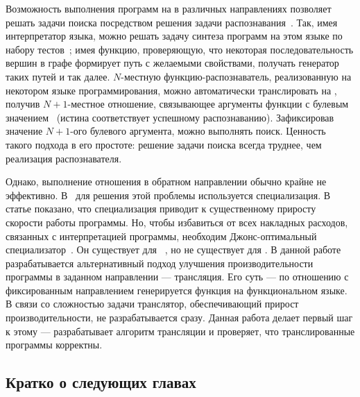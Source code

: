 Возможность выполнения программ на \miniKanren{} в различных направлениях позволяет решать задачи поиска посредством решения задачи распознавания~\cite{lozov2019relational}.
Так, имея интерпретатор языка, можно решать задачу синтеза программ на этом языке по набору тестов~\cite{byrd2017unified}; имея функцию, проверяющую, что некоторая последовательность вершин в графе формирует путь с желаемыми свойствами, получать генератор таких путей и так далее. 
$N$-местную функцию-распознаватель, реализованную на некотором языке программирования, можно автоматически транслировать на \miniKanren{}, получив $N+1$-местное отношение, связывающее аргументы функции с булевым значением~\cite{lozov2019relational} (истина соответствует успешному распознаванию). 
Зафиксировав значение $N+1$-ого булевого аргумента, можно выполнять поиск. 
Ценность такого подхода в его простоте: решение задачи поиска всегда труднее, чем реализация распознавателя. 

Однако, выполнение отношения в обратном направлении обычно крайне не эффективно. 
В~\cite{lozov2019relational} для решения этой проблемы используется специализация. 
В статье показано, что специализация приводит к существенному приросту скорости работы программы.
Но, чтобы избавиться от всех накладных расходов, связанных с интерпретацией программы, необходим Джонс-оптимальный специализатор~\cite{jones1993partial}.
Он существует для \prolog{}~\cite{Leuschel2004SIU}, но не существует для \miniKanren{}.
В данной работе разрабатывается альтернативный подход улучшения производительности программы в заданном направлении --- трансляция.
Его суть --- по отношению с фиксированным направлением генерируется функция на функциональном языке.
В связи со сложностью задачи транслятор, обеспечивающий прирост производительности, не разрабатывается сразу.
Данная работа делает первый шаг к этому --- разрабатывает алгоритм трансляции и проверяет, что транслированные программы корректны.

\subsection*{Кратко о следующих главах}

